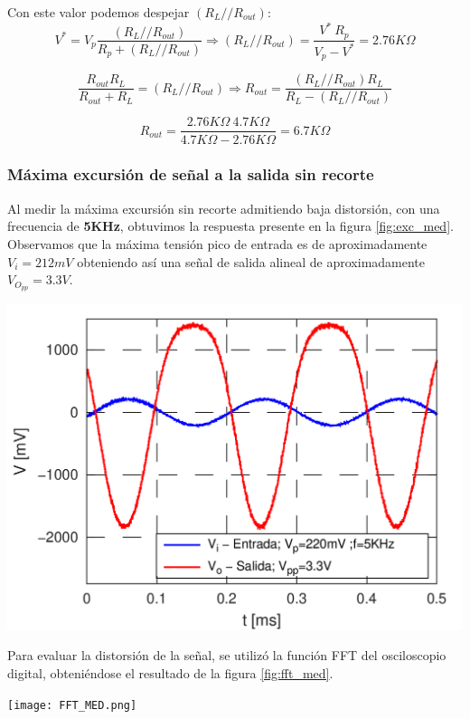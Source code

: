 \documentclass[a4paper, 10pt, spanish]{article}
\begin{document}
Con este valor podemos despejar $(R_L//R_{out})$:
\begin{equation}
  V^*=V_p \frac{(R_L//R_{out})}{R_p + (R_L//R_{out})} \Rightarrow (R_L//R_{out}) = \frac{V^*\ R_p}{V_p-V^*} = 2.76K\Omega
\end{equation}

\begin{equation}
  \frac{R_{out}R_L}{R_{out}+R_L} = (R_L//R_{out})  \Rightarrow R_{out}=\frac{(R_L//R_{out}) R_L}{R_L - (R_L//R_{out})}
\end{equation}

\begin{equation}
  R_{out}=\frac{2.76K\Omega\ 4.7K\Omega}{4.7K\Omega - 2.76K\Omega}=6.7K\Omega
\end{equation}

\subsubsection{Máxima excursión de señal a la salida sin recorte}
Al medir la máxima excursión sin recorte admitiendo baja distorsión, con una frecuencia de \textbf{5KHz}, obtuvimos la respuesta presente en la figura \ref{fig:exc_med}. Observamos que la máxima tensión pico de entrada es de aproximadamente $V_i=212mV$ obteniendo así una señal de salida alineal de aproximadamente $V_{O_{pp}}=3.3V$.

\begin{center}
  \includegraphics[width=.7\textwidth]{excursion.png}
  \label{fig:exc_med}
\end{center}

Para evaluar la distorsión de la señal, se utilizó la función FFT del osciloscopio digital, obteniéndose el resultado de la figura \ref{fig:fft_med}.

\begin{center}
  \texttt{[image: FFT\_MED.png]}
  \label{fig:fft_med}
\end{center}
\end{document}
